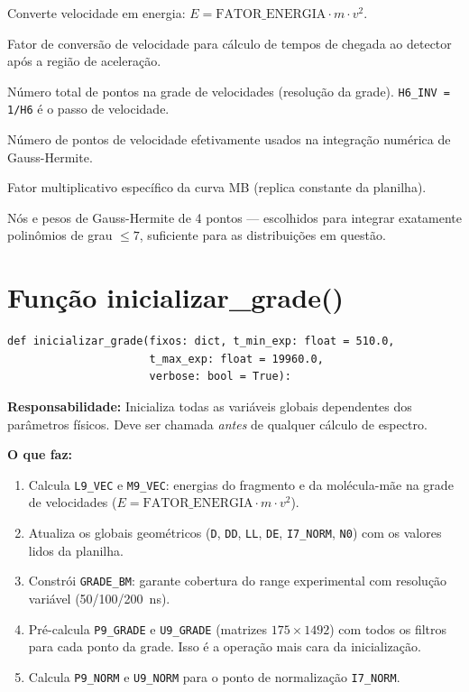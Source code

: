 \documentclass[12pt,a4paper]{report}
\newcommand{\code}[1]{\texttt{#1}}
\begin{document}
\begin{description}[leftmargin=2.5em, style=nextline]
  \item[\texttt{FATOR\_ENERGIA = 7837.5}]
    Converte velocidade em energia: $E = \text{FATOR\_ENERGIA} \cdot m \cdot v^2$.
  \item[\texttt{FATOR\_VELOCIDADE = 16.8}]
    Fator de conversão de velocidade para cálculo de tempos de chegada
    ao detector após a região de aceleração.
  \item[\texttt{H6 = 120000}]
    Número total de pontos na grade de velocidades (resolução da grade).
    \texttt{H6\_INV = 1/H6} é o passo de velocidade.
  \item[\texttt{N\_VEL = 1492}]
    Número de pontos de velocidade efetivamente usados na integração
    numérica de Gauss-Hermite.
  \item[\texttt{FMB = 1.7}]
    Fator multiplicativo específico da curva MB (replica constante da planilha).
  \item[\texttt{X\_GH, W\_GH}]
    Nós e pesos de Gauss-Hermite de 4 pontos — escolhidos para integrar
    exatamente polinômios de grau $\leq 7$, suficiente para as distribuições
    em questão.
\end{description}

\section{Função inicializar\_grade()}

\begin{lstlisting}[caption={Assinatura de inicializar\_grade()}]
def inicializar_grade(fixos: dict, t_min_exp: float = 510.0,
                      t_max_exp: float = 19960.0,
                      verbose: bool = True):
\end{lstlisting}

\textbf{Responsabilidade:} Inicializa todas as variáveis globais dependentes
dos parâmetros físicos. Deve ser chamada \emph{antes} de qualquer cálculo
de espectro.

\textbf{O que faz:}
\begin{enumerate}
  \item Calcula \code{L9\_VEC} e \code{M9\_VEC}: energias do fragmento e da
    molécula-mãe na grade de velocidades ($E = \text{FATOR\_ENERGIA} \cdot m \cdot v^2$).
  \item Atualiza os globais geométricos (\code{D}, \code{DD}, \code{LL},
    \code{DE}, \code{I7\_NORM}, \code{N0}) com os valores lidos da planilha.
  \item Constrói \code{GRADE\_BM}: garante cobertura do range experimental
    com resolução variável (50/100/200~ns).
  \item Pré-calcula \code{P9\_GRADE} e \code{U9\_GRADE} (matrizes
    $175 \times 1492$) com todos os filtros para cada ponto da grade.
    Isso é a operação mais cara da inicialização.
  \item Calcula \code{P9\_NORM} e \code{U9\_NORM} para o ponto de
    normalização \code{I7\_NORM}.
\end{enumerate}
\end{document}
